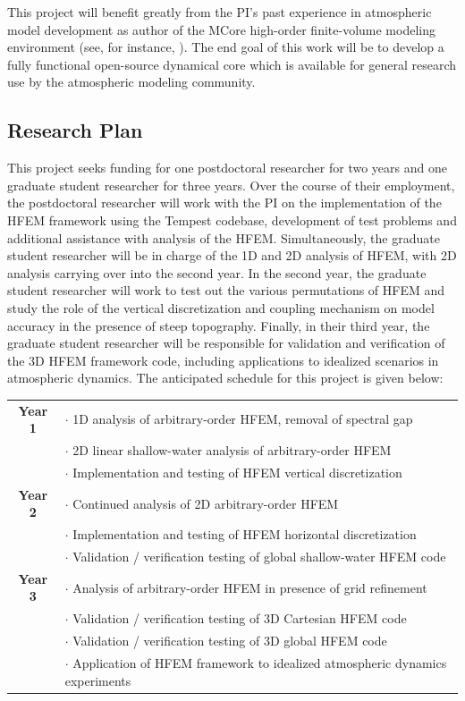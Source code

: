 \documentclass[11pt]{article}
\begin{document}
This project will benefit greatly from the PI's past experience in atmospheric model development as author of the MCore high-order finite-volume modeling environment (see, for instance, \cite{PAUCJBVL2010JCP,PAUCJ2012MWR,PAUCJ2012JCP}).  The end goal of this work will be to develop a fully functional open-source dynamical core which is available for general research use by the atmospheric modeling community.

\subsection{Research Plan} \label{sec:ResearchPlan}

This project seeks funding for one postdoctoral researcher for two years and one graduate student researcher for three years.  Over the course of their employment, the postdoctoral researcher will work with the PI on the implementation of the HFEM framework using the Tempest codebase, development of test problems and additional assistance with analysis of the HFEM.  Simultaneously, the graduate student researcher will be in charge of the 1D and 2D analysis of HFEM, with 2D analysis carrying over into the second year.  In the second year, the graduate student researcher will work to test out the various permutations of HFEM and study the role of the vertical discretization and coupling mechanism on model accuracy in the presence of steep topography.  Finally, in their third year, the graduate student researcher will be responsible for validation and verification of the 3D HFEM framework code, including applications to idealized scenarios in atmospheric dynamics.  The anticipated schedule for this project is given below:

\begin{tabularx}{\textwidth}{cX}
\hline
\textbf{Year 1} & $\cdot$ 1D analysis of arbitrary-order HFEM, removal of spectral gap \\
& $\cdot$ 2D linear shallow-water analysis of arbitrary-order HFEM \\
& $\cdot$ Implementation and testing of HFEM vertical discretization \\
\hline
\textbf{Year 2} & $\cdot$ Continued analysis of 2D arbitrary-order HFEM \\
& $\cdot$ Implementation and testing of HFEM horizontal discretization \\
& $\cdot$ Validation / verification testing of global shallow-water HFEM code \\
\hline
\textbf{Year 3} & $\cdot$ Analysis of arbitrary-order HFEM in presence of grid refinement \\
& $\cdot$ Validation / verification testing of 3D Cartesian HFEM code \\
& $\cdot$ Validation / verification testing of 3D global HFEM code \\
& $\cdot$ Application of HFEM framework to idealized atmospheric dynamics experiments \\
\hline
\end{tabularx}
\end{document}
